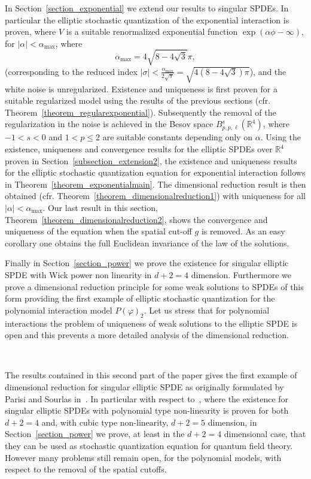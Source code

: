 \documentclass[a4paper,10pt]{article}
\begin{document}
In Section~\ref{section_exponential} we extend our results to singular SPDEs.
In particular the elliptic stochastic quantization of the exponential
interaction is proven, where $V$ is a suitable renormalized exponential
function $\exp (\alpha \phi - \infty)$, for $| \alpha | < \alpha_{\text{max}}$, where 
\begin{equation}\label{eq:alphamax}
 \alpha_{\text{max}}= 4 \sqrt{8 - 4
\sqrt{3}} \pi,
\end{equation}
(corresponding to the reduced index $| \sigma | <\frac{\alpha_{\text{max}}}{2\sqrt{\pi}}= \sqrt{4
\left( 8 - 4 \sqrt{3} \right) \pi}$), and the white noise is unregularized.
Existence and uniqueness is first proven for a suitable regularized model
using the results of the previous sections (cfr.
Theorem~\ref{theorem_regularexponential}). Subsequently the removal of the
regularization in the noise is achieved in the Besov space $B^s_{p, p, \ell}
(\mathbb{R}^4)$, where $- 1 < s < 0$ and $1 < p \leqslant 2$ are suitable
constants depending only on $\alpha$. Using the existence, uniqueness and
convergence results for the elliptic SPDEs over $\mathbb{R}^4$ proven in
Section~\ref{subsection_extension2}, the existence and uniqueness results for
the elliptic stochastic quantization equation for exponential interaction
follows in Theorem~\ref{theorem_exponentialmain}. The dimensional reduction
result is then obtained (cfr. Theorem~\ref{theorem_dimensionalreduction1})
with uniqueness for all $| \alpha | < \alpha_{\text{max}}$. Our last
result in this section, Theorem~\ref{theorem_dimensionalreduction2}, shows the
convergence and uniqueness of the equation when the spatial cut-off $g$ is
removed. As an easy corollary one obtains the full Euclidean invariance of the
law of the solutions.

Finally in Section~\ref{section_power} we prove the existence for singular
elliptic SPDE with Wick power non linearity in $d + 2 = 4$ dimension.
Furthermore we prove a dimensional reduction principle for some weak solutions
to SPDEs of this form providing the first example of elliptic stochastic
quantization for the polynomial interaction model $P (\varphi)_2$. Let us
stress that for polynomial interactions the problem of uniqueness of weak
solutions to the elliptic SPDE is open and this prevents a more detailed
analysis of the dimensional reduction.

\

The results contained in this second part of the paper gives the first
example of dimensional reduction for singular elliptic SPDE as originally
formulated by Parisi and Sourlas in~{\cite{parisi_random_1979}}. In particular
with respect to~{\cite{GH18}}, where the existence for singular elliptic SPDEs
with polynomial type non-linearity is proven for both $d + 2 = 4$ and, with
cubic type non-linearity, $d + 2 = 5$ dimension, in
Section~\ref{section_power} we prove, at least in the $d + 2 = 4$ dimensional
case, that they can be used as stochastic quantization equation for quantum
field theory. However many problems still remain open, for the polynomial
models, with respect to the removal of the spatial cutoffs.
\end{document}
